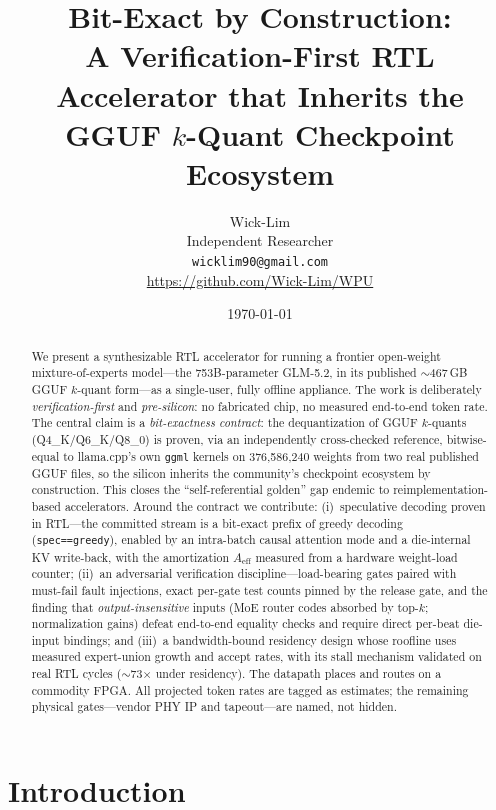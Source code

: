 \documentclass[11pt]{article}
\title{\textbf{Bit-Exact by Construction:\\
A Verification-First RTL Accelerator that Inherits the\\
GGUF $k$-Quant Checkpoint Ecosystem}}
\author{Wick-Lim\\
\small Independent Researcher\\
\small \texttt{wicklim90@gmail.com}\\
\small \url{https://github.com/Wick-Lim/WPU}}
\date{\today}
\newcommand{\code}[1]{\texttt{#1}}
\begin{document}
\maketitle

\begin{abstract}
We present a synthesizable RTL accelerator for running a frontier open-weight
mixture-of-experts model---the 753B-parameter GLM-5.2, in its published
$\sim$467\,GB GGUF $k$-quant form---as a single-user, fully offline appliance.
The work is deliberately \emph{verification-first} and \emph{pre-silicon}: no
fabricated chip, no measured end-to-end token rate. The central claim is a
\emph{bit-exactness contract}: the dequantization of GGUF $k$-quants
(Q4\_K/Q6\_K/Q8\_0) is proven, via an independently cross-checked reference,
bitwise-equal to llama.cpp's own \code{ggml} kernels on 376{,}586{,}240 weights
from two real published GGUF files, so the silicon inherits the community's
checkpoint ecosystem by construction. This closes the ``self-referential
golden'' gap endemic to reimplementation-based accelerators. Around the
contract we contribute: (i)~speculative decoding proven in RTL---the committed
stream is a bit-exact prefix of greedy decoding (\code{spec==greedy}), enabled
by an intra-batch causal attention mode and a die-internal KV write-back, with
the amortization $A_{\mathrm{eff}}$ measured from a hardware weight-load
counter; (ii)~an adversarial verification discipline---load-bearing gates
paired with must-fail fault injections, exact per-gate test counts pinned by
the release gate, and the finding that \emph{output-insensitive} inputs (MoE
router codes absorbed by top-$k$; normalization gains) defeat end-to-end
equality checks and require direct per-beat die-input bindings; and (iii)~a
bandwidth-bound residency design whose roofline uses measured expert-union
growth and accept rates, with its stall mechanism validated on real RTL cycles
($\sim$73$\times$ under residency). The datapath places and routes on a
commodity FPGA. All projected token rates are tagged as estimates; the
remaining physical gates---vendor PHY IP and tapeout---are named, not hidden.
\end{abstract}

\section{Introduction}
\end{document}
